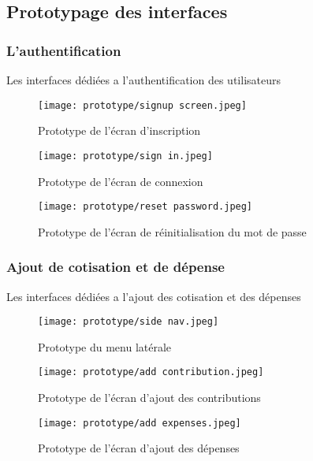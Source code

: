 \subsection{Prototypage des interfaces}
\subsubsection{L'authentification}
Les interfaces dédiées a l'authentification des utilisateurs 
\begin{figure}[!htbp]
\begin{minipage}[t]{0.25\textwidth}    %
        \texttt{[image: prototype/signup screen.jpeg]}
        \caption{ Prototype de l'écran d'inscription}
  \end{minipage}%
  \begin{minipage}{0.10\textwidth}
    \hfill
  \end{minipage}
\begin{minipage}[t]{0.25\textwidth}
        \texttt{[image: prototype/sign in.jpeg]}
        \caption{ Prototype de l'écran de connexion}
\end{minipage}%
\begin{minipage}{0.10\textwidth}
    \hfill
\end{minipage}
  \begin{minipage}[t]{0.25\textwidth}
        \texttt{[image: prototype/reset password.jpeg]}
        \caption{ Prototype de l'écran de réinitialisation du mot de passe}
\end{minipage}
\end{figure}
\newpage
\subsubsection{Ajout de cotisation et de dépense}
Les interfaces dédiées a l'ajout des cotisation et des dépenses
\begin{figure}[h]
    \begin{minipage}[t]{0.25\textwidth}    %
            \texttt{[image: prototype/side nav.jpeg]}
            \caption{ Prototype du menu latérale}
      \end{minipage}%
      \begin{minipage}{0.10\textwidth}
        \hfill
      \end{minipage}
    \begin{minipage}[t]{0.25\textwidth}
            \texttt{[image: prototype/add contribution.jpeg]}
            \caption{ Prototype de l'écran d'ajout des contributions}
    \end{minipage}%
    \begin{minipage}{0.10\textwidth}
        \hfill
    \end{minipage}
      \begin{minipage}[t]{0.25\textwidth}
            \texttt{[image: prototype/add expenses.jpeg]}
            \caption{ Prototype de l'écran d'ajout des dépenses}
    \end{minipage}
    \end{figure}
    \newpage
